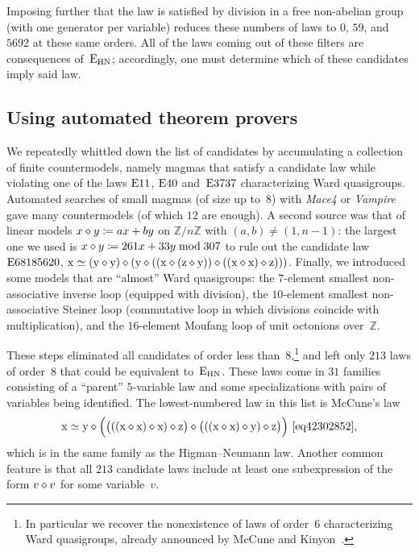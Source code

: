 Imposing further that the law is satisfied by division in a free non-abelian group (with one generator per variable) reduces these numbers of laws to $0$, $59$, and $\num{5692}$ at these same orders.  All of the laws coming out of these filters are consequences of~$\mathrm{E}_{\mathrm{HN}}$; accordingly, one must determine which of these candidates imply said law.

\subsection{Using automated theorem provers}

We repeatedly whittled down the list of candidates by accumulating a collection of finite countermodels, namely magmas that satisfy a candidate law while violating one of the laws $\mathrm{E}11$, $\mathrm{E}40$ and~$\mathrm{E}3737$ characterizing Ward quasigroups.  Automated searches of small magmas (of size up to~$8$) with \emph{Mace4} or \emph{Vampire} gave many countermodels (of which $12$ are enough).  A second source was that of linear models $x \diamond y \coloneqq ax+by$ on $\mathbb{Z}/n\mathbb{Z}$ with $(a,b)\neq(1,n-1)$: the largest one we used is $x \diamond y \coloneqq 261x + 33y \bmod 307$ to rule out the candidate law $\mathrm{E}68185620$, $\mathrm{x} \simeq (\mathrm{y} \diamond \mathrm{y}) \diamond (\mathrm{y} \diamond ((\mathrm{x} \diamond (\mathrm{z} \diamond \mathrm{y})) \diamond ((\mathrm{x} \diamond \mathrm{x}) \diamond \mathrm{z})))$.  Finally, we introduced some models that are ``almost'' Ward quasigroups: the $7$-element smallest non-associative inverse loop (equipped with division), the $10$-element smallest non-associative Steiner loop (commutative loop in which divisions coincide with multiplication), and the $16$-element Moufang loop of unit octonions over~$\mathbb{Z}$.

These steps eliminated all candidates of order less than~$8$,\footnote{In particular we recover the nonexistence of laws of order~$6$ characterizing Ward quasigroups, already announced by McCune and Kinyon~\cite{mccune-webpage-gtsax}.} and left only $213$ laws of order~$8$ that could be equivalent to~$\mathrm{E}_{\mathrm{HN}}$.  These laws come in $31$ families consisting of a ``parent'' $5$-variable law and some specializations with pairs of variables being identified.  The lowest-numbered law in this list is McCune's law
\[
\x \formaleq \y \op \Bigl(\bigl(((\x \op \x) \op \x) \op \z\bigr) \op \bigl(((\x \op \x) \op \y) \op \z\bigr)\Bigr) \ \eqref{eq42302852},
\]
which is in the same family as the Higman--Neumann law.  Another common feature is that all $213$ candidate laws include at least one subexpression of the form $v \diamond v$ for some variable~$v$.

